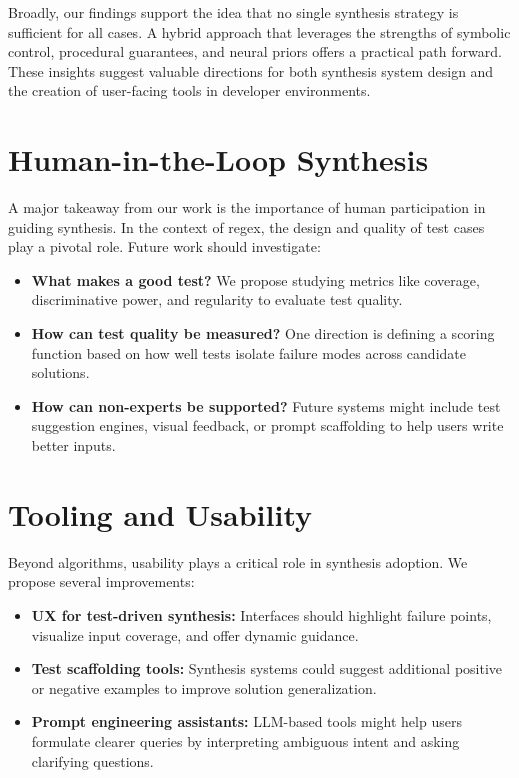 \indent\indent Broadly, our findings support the idea that no single synthesis strategy is sufficient for all cases. A hybrid approach that leverages the strengths of symbolic control, procedural guarantees, and neural priors offers a practical path forward. These insights suggest valuable directions for both synthesis system design and the creation of user-facing tools in developer environments.

\section{Human-in-the-Loop Synthesis}

\indent\indent A major takeaway from our work is the importance of human participation in guiding synthesis. In the context of regex, the design and quality of test cases play a pivotal role. Future work should investigate:

\begin{itemize}
  \item \textbf{What makes a good test?} We propose studying metrics like coverage, discriminative power, and regularity to evaluate test quality.
  \item \textbf{How can test quality be measured?} One direction is defining a scoring function based on how well tests isolate failure modes across candidate solutions.
  \item \textbf{How can non-experts be supported?} Future systems might include test suggestion engines, visual feedback, or prompt scaffolding to help users write better inputs.
\end{itemize}

\section{Tooling and Usability}

\indent\indent Beyond algorithms, usability plays a critical role in synthesis adoption. We propose several improvements:

\begin{itemize}
  \item \textbf{UX for test-driven synthesis:} Interfaces should highlight failure points, visualize input coverage, and offer dynamic guidance.
  \item \textbf{Test scaffolding tools:} Synthesis systems could suggest additional positive or negative examples to improve solution generalization.
  \item \textbf{Prompt engineering assistants:} LLM-based tools might help users formulate clearer queries by interpreting ambiguous intent and asking clarifying questions.
\end{itemize}

